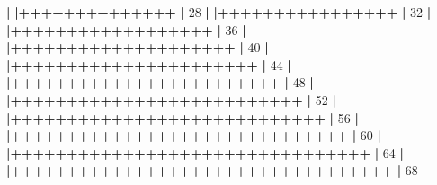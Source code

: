 \documentclass[]{article}
\newenvironment{Shaded}{\begin{snugshade}}{\end{snugshade}}
\newcommand{\DecValTok}[1]{\textcolor[rgb]{0.00,0.00,0.81}{#1}}
\newcommand{\ErrorTok}[1]{\textcolor[rgb]{0.64,0.00,0.00}{\textbf{#1}}}
\newcommand{\NormalTok}[1]{#1}
\newcommand{\OperatorTok}[1]{\textcolor[rgb]{0.81,0.36,0.00}{\textbf{#1}}}
\newcommand{\StringTok}[1]{\textcolor[rgb]{0.31,0.60,0.02}{#1}}
\begin{document}
\begin{Shaded}
\begin{Highlighting}[]
{{{{{{{  \OperatorTok{|}\StringTok{                                                        }
\StringTok{  }\ErrorTok{|}\OperatorTok{++++++++++++++}\StringTok{                                    }\ErrorTok{|}\StringTok{  }\DecValTok{28}\NormalTok{%
  \OperatorTok{|}\StringTok{                                                        }
\StringTok{  }\ErrorTok{|}\OperatorTok{++++++++++++++++}\StringTok{                                  }\ErrorTok{|}\StringTok{  }\DecValTok{32}\NormalTok{%
  \OperatorTok{|}\StringTok{                                                        }
\StringTok{  }\ErrorTok{|}\OperatorTok{++++++++++++++++++}\StringTok{                                }\ErrorTok{|}\StringTok{  }\DecValTok{36}\NormalTok{%
  \OperatorTok{|}\StringTok{                                                        }
\StringTok{  }\ErrorTok{|}\OperatorTok{++++++++++++++++++++}\StringTok{                              }\ErrorTok{|}\StringTok{  }\DecValTok{40}\NormalTok{%
  \OperatorTok{|}\StringTok{                                                        }
\StringTok{  }\ErrorTok{|}\OperatorTok{++++++++++++++++++++++}\StringTok{                            }\ErrorTok{|}\StringTok{  }\DecValTok{44}\NormalTok{%
  \OperatorTok{|}\StringTok{                                                        }
\StringTok{  }\ErrorTok{|}\OperatorTok{++++++++++++++++++++++++}\StringTok{                          }\ErrorTok{|}\StringTok{  }\DecValTok{48}\NormalTok{%
  \OperatorTok{|}\StringTok{                                                        }
\StringTok{  }\ErrorTok{|}\OperatorTok{++++++++++++++++++++++++++}\StringTok{                        }\ErrorTok{|}\StringTok{  }\DecValTok{52}\NormalTok{%
  \OperatorTok{|}\StringTok{                                                        }
\StringTok{  }\ErrorTok{|}\OperatorTok{++++++++++++++++++++++++++++}\StringTok{                      }\ErrorTok{|}\StringTok{  }\DecValTok{56}\NormalTok{%
  \OperatorTok{|}\StringTok{                                                        }
\StringTok{  }\ErrorTok{|}\OperatorTok{++++++++++++++++++++++++++++++}\StringTok{                    }\ErrorTok{|}\StringTok{  }\DecValTok{60}\NormalTok{%
  \OperatorTok{|}\StringTok{                                                        }
\StringTok{  }\ErrorTok{|}\OperatorTok{++++++++++++++++++++++++++++++++}\StringTok{                  }\ErrorTok{|}\StringTok{  }\DecValTok{64}\NormalTok{%
  \OperatorTok{|}\StringTok{                                                        }
\StringTok{  }\ErrorTok{|}\OperatorTok{++++++++++++++++++++++++++++++++++}\StringTok{                }\ErrorTok{|}\StringTok{  }\DecValTok{68}\NormalTok{%
}}}}}}}}}}}}}}}}}}
\end{Highlighting}
\end{Shaded}
\end{document}
